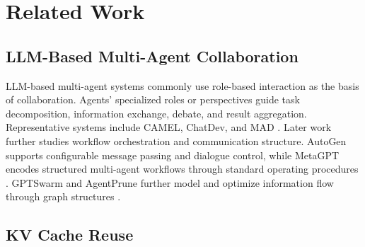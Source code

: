 \documentclass[letterpaper]{article} %
\begin{document}
\section{Related Work}

\subsection{LLM-Based Multi-Agent Collaboration}

LLM-based multi-agent systems commonly use role-based interaction as the basis of collaboration. Agents' specialized roles or perspectives guide task decomposition, information exchange, debate, and result aggregation. Representative systems include CAMEL, ChatDev, and MAD \citep{DBLP:conf/nips/LiHIKG23, DBLP:conf/acl/QianLLCDL0CSCXL24, DBLP:conf/emnlp/Liang0JW00Y0T24}. Later work further studies workflow orchestration and communication structure. AutoGen supports configurable message passing and dialogue control, while MetaGPT encodes structured multi-agent workflows through standard operating procedures \citep{DBLP:journals/corr/abs-2308-08155, DBLP:conf/iclr/HongZCZCWZWYLZR24}. GPTSwarm and AgentPrune further model and optimize information flow through graph structures \citep{DBLP:conf/icml/ZhugeWKFKS24, DBLP:conf/iclr/ZhangYLYWWCY025}.


\subsection{KV Cache Reuse}
\end{document}
